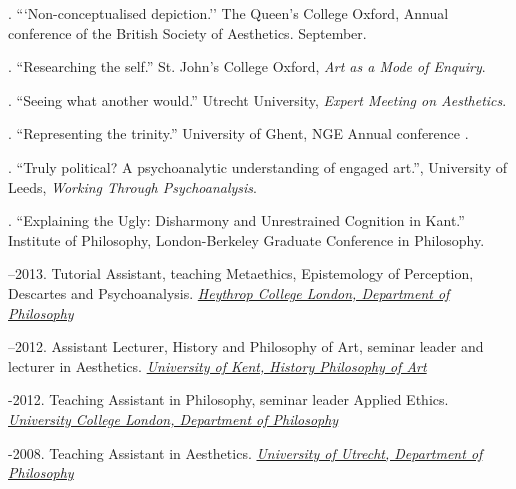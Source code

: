 \documentclass[12pt]{article}
\begin{document}

. ```Non-conceptualised depiction.'' The Queen's College Oxford, Annual conference of the British Society of Aesthetics. September.

. ``Researching the self.'' St. John's College Oxford, \emph{Art as a Mode of Enquiry}.

. ``Seeing what another would.'' Utrecht University, \emph{Expert Meeting on Aesthetics}.

. ``Representing the trinity.'' University of Ghent, NGE Annual conference .

. ``Truly political? A psychoanalytic understanding of engaged art.'', University of Leeds, \emph{Working Through Psychoanalysis}.


. ``Explaining the Ugly: Disharmony and Unrestrained Cognition in Kant.'' Institute of Philosophy, London-Berkeley Graduate Conference in Philosophy.

\bigskip
{}


--2013. Tutorial Assistant, teaching Metaethics, Epistemology of Perception, Descartes and Psychoanalysis. \href{http://www.heythrop.ac.uk/departments/academic-departments/philosophy/}{\emph{Heythrop College London, Department of  Philosophy} \vspace{0.01in}}

\medskip

--2012. Assistant Lecturer, History and Philosophy of Art, seminar leader and lecturer in Aesthetics. \href{http://www.kent.ac.uk/arts/hpa/index.html}{\emph{University of Kent, History \amper Philosophy of Art} \vspace{0.01in}}

\medskip

-2012. Teaching Assistant in Philosophy, seminar leader Applied Ethics. \href{http://www.ucl.ac.uk/philosophy/}{\emph{University College London, Department of  Philosophy}} \vspace{0.01in}

% 
% 
% 
-2008. Teaching Assistant in Aesthetics. \href{http://www.uu.nl/faculty/humanities/EN/organisation/departments/departmentofphilosophy/Pages/default.aspx}{\emph{University of Utrecht, Department of  Philosophy}} \vspace{0.01in}
\end{document}
